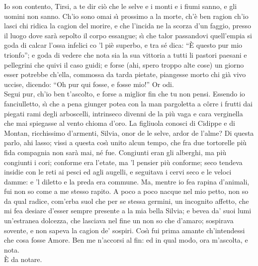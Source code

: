 \documentclass{book}
\begin{document}
   \4 Io son contento,
	Tirsi, a te dir ci\`o che le selve e i monti
	e i fiumi sanno, e gli uomini non sanno.
	Ch'io sono omai s\`{\i} prossimo a la morte,
	ch'\`e ben ragion ch'io lasci chi ridica
	la cagion del morire, e che l'incida
	ne la scorza d'un faggio, presso il luogo
	dove sar\`a sepolto il corpo essangue;
	s\`{\i} che talor passandovi quell'empia
	si goda di calcar l'ossa infelici
	co 'l pi\`e superbo, e tra s\'e dica: ``\`E questo
	pur mio trionfo''; e goda di vedere
	che nota sia la sua vittoria a tutti
	li pastori paesani e pellegrini
	che quivi il caso guidi; e forse (ahi, spero
	troppo alte cose) un giorno esser potrebbe
	ch'ella, commossa da tarda pietate,
	piangesse morto chi gi\`a vivo uccise,
	dicendo: ``Oh pur qui fosse, e fosse mio!''
	Or odi. \\

   \5 Segui pur, ch'io ben t'ascolto,
	e forse a miglior fin che tu non pensi.
	\4 Essendo io fanciulletto, s\`{\i} che a pena
	giunger potea con la man pargoletta
	a c\^orre i frutti dai piegati rami
	degli arboscelli, intrinseco divenni
	de la pi\`u vaga e cara verginella
	che mai spiegasse al vento chioma d'oro.
	La figliuola conosci di Cidippe
	e di Montan, ricchissimo d'armenti,
	Silvia, onor de le selve, ardor de l'alme?
	Di questa parlo, ahi lasso; vissi a questa
	cos\`{\i} unito alcun tempo, che fra due
	tortorelle pi\`u fida compagnia
	non sar\`a mai, n\'e fue.
	Congiunti eran gli alberghi,
	ma pi\`u congiunti i cori;
	conforme era l'etate,
	ma 'l pensier pi\`u conforme;
	seco tendeva insidie con le reti
	ai pesci ed agli augelli, e seguitava
	i cervi seco e le veloci damme:
	e 'l diletto e la preda era commune.
	Ma, mentre io fea rapina d'animali,
	fui non so come a me stesso rapito.
	A poco a poco nacque nel mio petto,
	non so da qual radice,
	com'erba suol che per se stessa germini,
	un incognito affetto,
	che mi fea desiare
	d'esser sempre presente
	a la mia bella Silvia;
	e bevea da' suoi lumi
	un'estranea dolcezza,
	che lasciava nel fine
	un non so che d'amaro;
	sospirava sovente, e non sapeva
	la cagion de' sospiri.
	Cos\`{\i} fui prima amante ch'intendessi
	che cosa fosse Amore.
	Ben me n'accorsi al fin: ed in qual modo,
	ora m'ascolta, e nota. \\

   \5 \`{E} da notare.
\end{document}
